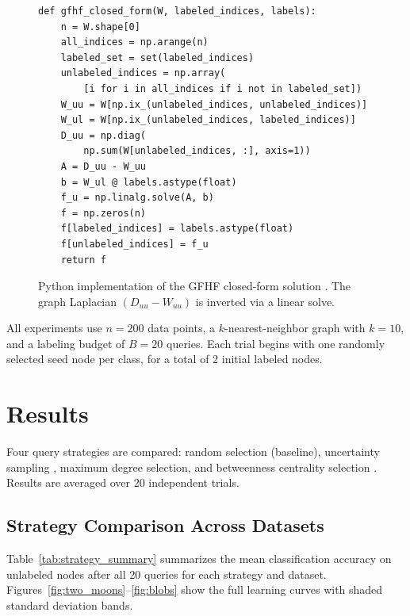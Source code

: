 \documentclass[12pt]{article}
\begin{document}
\begin{figure}[H]
{\small
\begin{verbatim}
def gfhf_closed_form(W, labeled_indices, labels):
    n = W.shape[0]
    all_indices = np.arange(n)
    labeled_set = set(labeled_indices)
    unlabeled_indices = np.array(
        [i for i in all_indices if i not in labeled_set])
    W_uu = W[np.ix_(unlabeled_indices, unlabeled_indices)]
    W_ul = W[np.ix_(unlabeled_indices, labeled_indices)]
    D_uu = np.diag(
        np.sum(W[unlabeled_indices, :], axis=1))
    A = D_uu - W_uu
    b = W_ul @ labels.astype(float)
    f_u = np.linalg.solve(A, b)
    f = np.zeros(n)
    f[labeled_indices] = labels.astype(float)
    f[unlabeled_indices] = f_u
    return f
\end{verbatim}
}
\caption{Python implementation of the GFHF closed-form solution \cite{Zhu2003}. The graph Laplacian $(D_{uu} - W_{uu})$ is inverted via a linear solve.}
\label{lst:gfhf}
\end{figure}

All experiments use $n = 200$ data points, a $k$-nearest-neighbor graph with $k = 10$, and a labeling budget of $B = 20$ queries. Each trial begins with one randomly selected seed node per class, for a total of 2 initial labeled nodes.


\section{Results}

Four query strategies are compared: random selection (baseline), uncertainty sampling \cite{Lewis1994}, maximum degree selection, and betweenness centrality selection \cite{Freeman1977}. Results are averaged over 20 independent trials.

\subsection{Strategy Comparison Across Datasets}

Table~\ref{tab:strategy_summary} summarizes the mean classification accuracy on unlabeled nodes after all 20 queries for each strategy and dataset. Figures~\ref{fig:two_moons}--\ref{fig:blobs} show the full learning curves with shaded standard deviation bands.
\end{document}
